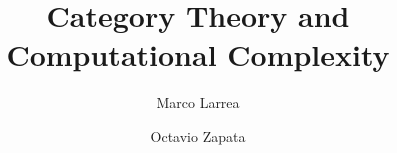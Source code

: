 

\title{Category Theory and \\ Computational Complexity}
\author{Marco Larrea \and Octavio Zapata}


\maketitle


\nocite{*}




